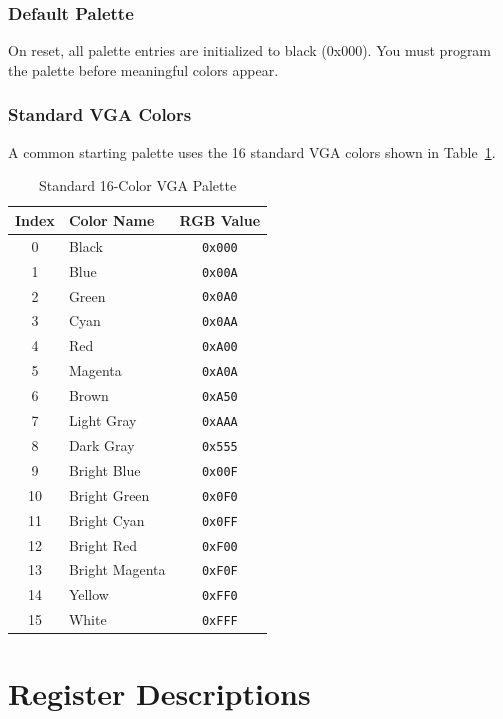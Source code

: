 \documentclass[11pt,letterpaper]{report}
\begin{document}
\subsection{Default Palette}

On reset, all palette entries are initialized to black (0x000). You must program the palette before meaningful colors appear.

\subsection{Standard VGA Colors}

A common starting palette uses the 16 standard VGA colors shown in Table~\ref{tab:standardpalette}.

\begin{table}[tbp]
\centering
\caption{Standard 16-Color VGA Palette}
\label{tab:standardpalette}
\begin{tabular}{clc}
\toprule
\textbf{Index} & \textbf{Color Name} & \textbf{RGB Value} \\
\midrule
0 & Black & \texttt{0x000} \\
1 & Blue & \texttt{0x00A} \\
2 & Green & \texttt{0x0A0} \\
3 & Cyan & \texttt{0x0AA} \\
4 & Red & \texttt{0xA00} \\
5 & Magenta & \texttt{0xA0A} \\
6 & Brown & \texttt{0xA50} \\
7 & Light Gray & \texttt{0xAAA} \\
8 & Dark Gray & \texttt{0x555} \\
9 & Bright Blue & \texttt{0x00F} \\
10 & Bright Green & \texttt{0x0F0} \\
11 & Bright Cyan & \texttt{0x0FF} \\
12 & Bright Red & \texttt{0xF00} \\
13 & Bright Magenta & \texttt{0xF0F} \\
14 & Yellow & \texttt{0xFF0} \\
15 & White & \texttt{0xFFF} \\
\bottomrule
\end{tabular}
\end{table}

\chapter{Register Descriptions}
\label{ch:registers}
\end{document}
